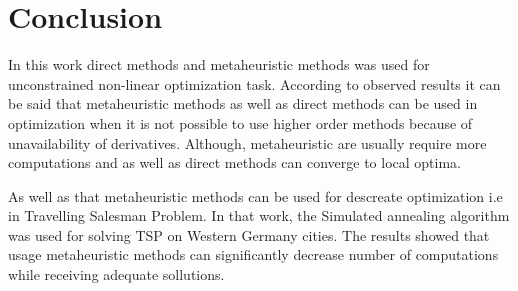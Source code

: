 \section*{Conclusion}

In this work direct methods and metaheuristic methods was used for unconstrained non-linear optimization task. 
According to observed results it can be said that metaheuristic methods as well as direct methods can be used
in optimization when it is not possible to use higher order methods because of unavailability of derivatives. Although,
metaheuristic are usually require more computations and as well as direct methods can converge to local optima.

As well as that metaheuristic methods can be used for descreate optimization i.e in Travelling Salesman Problem. In that work,
the Simulated annealing algorithm was used for solving TSP on Western Germany cities. The results showed that usage metaheuristic methods
can significantly decrease number of computations while receiving adequate sollutions.
